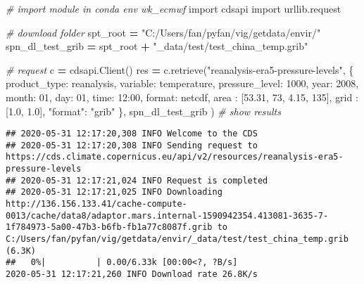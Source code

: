 \documentclass[
]{book}
\newenvironment{Shaded}{\begin{snugshade}}{\end{snugshade}}
\newcommand{\CommentTok}[1]{\textcolor[rgb]{0.56,0.35,0.01}{\textit{#1}}}
\newcommand{\DecValTok}[1]{\textcolor[rgb]{0.00,0.00,0.81}{#1}}
\newcommand{\FloatTok}[1]{\textcolor[rgb]{0.00,0.00,0.81}{#1}}
\newcommand{\ImportTok}[1]{#1}
\newcommand{\NormalTok}[1]{#1}
\newcommand{\OperatorTok}[1]{\textcolor[rgb]{0.81,0.36,0.00}{\textbf{#1}}}
\newcommand{\StringTok}[1]{\textcolor[rgb]{0.31,0.60,0.02}{#1}}
\begin{document}
\begin{Shaded}
\begin{Highlighting}[]
\CommentTok{\# import module in conda env wk\_ecmwf}
\ImportTok{import}\NormalTok{ cdsapi }
\ImportTok{import}\NormalTok{ urllib.request}

\CommentTok{\# download folder}
\NormalTok{spt\_root }\OperatorTok{=} \StringTok{"C:/Users/fan/pyfan/vig/getdata/envir/"}
\NormalTok{spn\_dl\_test\_grib }\OperatorTok{=}\NormalTok{ spt\_root }\OperatorTok{+} \StringTok{"\_data/test/test\_china\_temp.grib"}

\CommentTok{\# request}
\NormalTok{c }\OperatorTok{=}\NormalTok{ cdsapi.Client()}
\NormalTok{res }\OperatorTok{=}\NormalTok{ c.retrieve(}\StringTok{"reanalysis{-}era5{-}pressure{-}levels"}\NormalTok{,}
\NormalTok{  \{}
    \StringTok{\textquotesingle{}product\_type\textquotesingle{}}\NormalTok{: }\StringTok{\textquotesingle{}reanalysis\textquotesingle{}}\NormalTok{,}
    \StringTok{\textquotesingle{}variable\textquotesingle{}}\NormalTok{: }\StringTok{\textquotesingle{}temperature\textquotesingle{}}\NormalTok{,}
    \StringTok{\textquotesingle{}pressure\_level\textquotesingle{}}\NormalTok{: }\StringTok{\textquotesingle{}1000\textquotesingle{}}\NormalTok{,}
    \StringTok{\textquotesingle{}year\textquotesingle{}}\NormalTok{: }\StringTok{\textquotesingle{}2008\textquotesingle{}}\NormalTok{,}
    \StringTok{\textquotesingle{}month\textquotesingle{}}\NormalTok{: }\StringTok{\textquotesingle{}01\textquotesingle{}}\NormalTok{,}
    \StringTok{\textquotesingle{}day\textquotesingle{}}\NormalTok{: }\StringTok{\textquotesingle{}01\textquotesingle{}}\NormalTok{,}
    \StringTok{\textquotesingle{}time\textquotesingle{}}\NormalTok{: }\StringTok{\textquotesingle{}12:00\textquotesingle{}}\NormalTok{,}
    \StringTok{\textquotesingle{}format\textquotesingle{}}\NormalTok{: }\StringTok{\textquotesingle{}netcdf\textquotesingle{}}\NormalTok{,                 }
    \StringTok{\textquotesingle{}area\textquotesingle{}}\NormalTok{          : [}\FloatTok{53.31}\NormalTok{, }\DecValTok{73}\NormalTok{, }\FloatTok{4.15}\NormalTok{, }\DecValTok{135}\NormalTok{], }
    \StringTok{\textquotesingle{}grid\textquotesingle{}}\NormalTok{          : [}\FloatTok{1.0}\NormalTok{, }\FloatTok{1.0}\NormalTok{],}
    \StringTok{"format"}\NormalTok{: }\StringTok{"grib"}
\NormalTok{  \},}
\NormalTok{  spn\_dl\_test\_grib}
\NormalTok{)}
\CommentTok{\# show results}
\end{Highlighting}
\end{Shaded}

\begin{verbatim}
## 2020-05-31 12:17:20,308 INFO Welcome to the CDS
## 2020-05-31 12:17:20,308 INFO Sending request to https://cds.climate.copernicus.eu/api/v2/resources/reanalysis-era5-pressure-levels
## 2020-05-31 12:17:21,024 INFO Request is completed
## 2020-05-31 12:17:21,025 INFO Downloading http://136.156.133.41/cache-compute-0013/cache/data8/adaptor.mars.internal-1590942354.413081-3635-7-1f784973-5a00-47b3-b6fb-fb1a77c8087f.grib to C:/Users/fan/pyfan/vig/getdata/envir/_data/test/test_china_temp.grib (6.3K)
##   0%|          | 0.00/6.33k [00:00<?, ?B/s]                                           2020-05-31 12:17:21,260 INFO Download rate 26.8K/s
\end{verbatim}
\end{document}
